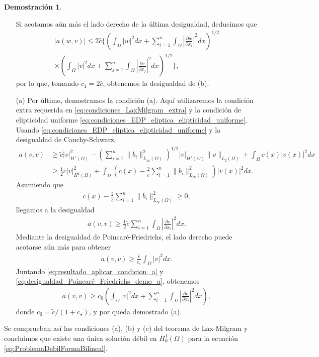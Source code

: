 \documentclass[a4paper,11pt,spanish, twoside, leqno]{tfg-uam}
\theoremstyle{definition}
\newtheorem{dem}[teor]{Demostración}
\begin{document}
\begin{dem}
\begin{itemize}
        Si acotamos aún más el lado derecho de la última desigualdad, deducimos que
        \begin{align*}
            |a(w, v)| \leq 2\hat{c} \Bigg\{ \left(\int_{\Omega} |w|^2 dx + \sum_{i=1}^n \int_{\Omega} \left| \frac{\partial w}{\partial x_i} \right|^2 dx \right)^{1/2} \\
            \times \left(\int_{\Omega} |v|^2 dx + \sum_{j=1}^n \int_{\Omega} \left| \frac{\partial v}{\partial x_j} \right|^2 dx \right)^{1/2} \Bigg\},
        \end{align*}
        por lo que, tomando $c_1 = 2\hat{c}$, obtenemos la desigualdad de (b).
        \item[(a)] Por último, demostramos la condición (a). Aquí utilizaremos la condición extra requerida en \eqref{eq:condiciones_LaxMilgram_extra} y la condición de elipticidad uniforme \eqref{eq:condiciones_EDP_eliptica_elipticidad_uniforme}. Usando  \eqref{eq:condiciones_EDP_eliptica_elipticidad_uniforme} y la desigualdad de Cauchy-Schwarz,
        \begin{align*}
        a(v, v) &\geq \tilde{c} |v|^2_{H^1(\Omega)} - 
        \left( \sum_{i=1}^{n} \|b_i\|^2_{L_{\infty}(\Omega)} \right)^{1/2} 
        |v|_{H^1(\Omega)} \|v\|_{L_2(\Omega)} 
        + \int_{\Omega} c(x) |v(x)|^2 dx \\
        &\geq \frac{1}{2} \tilde{c} |v|^2_{H^1(\Omega)} 
        + \int_{\Omega} \left( c(x) - \frac{2}{\tilde{c}} \sum_{i=1}^{n} \|b_i\|^2_{L_{\infty}(\Omega)} \right) |v(x)|^2 dx.
        \end{align*}
        Asumiendo que 
        \begin{align*}
        c(x) - \frac{2}{\tilde{c}} \sum_{i=1}^{n} \|b_i\|^2_{L_{\infty}(\Omega)} \geq 0,
        \end{align*}
        llegamos a la desigualdad 
        \begin{align}\label{eq:resultado_aplicar_condicion_a}
        a(v, v) \geq \frac{1}{2} \tilde{c} \sum_{i=1}^{n} \int_{\Omega} \left| \frac{\partial v}{\partial x_i} \right|^2 dx.
        \end{align}
        Mediante la desigualdad de Poincaré-Friedrichs, el lado derecho puede acotarse aún más para obtener
        \begin{align}\label{eq:desigualdad_Poincaré_Friedrichs_demo_a}
        a(v, v) \geq \frac{\tilde{c}}{c_{\star}} \int_{\Omega} |v|^2 dx.
        \end{align}
        Juntando \eqref{eq:resultado_aplicar_condicion_a} y \eqref{eq:desigualdad_Poincaré_Friedrichs_demo_a}, obtenemos
        \begin{align}
        a(v, v) \geq c_0 \left( \int_{\Omega} |v|^2 dx + \sum_{i=1}^{n} \int_{\Omega} \left| \frac{\partial v}{\partial x_i} \right|^2 dx \right),
        \end{align}
        donde $c_0 = \tilde{c}/(1 + c_{\star})$, y por queda demostrado (a).
    \end{itemize}
    Se comprueban así las condiciones (a), (b) y (c) del teorema de Lax-Milgram y concluimos que existe una única solución débil en $H^1_0(\Omega)$ para la ecuación \eqref{eq:ProblemaDebilFormaBilineal}.
\end{dem}
\end{document}
